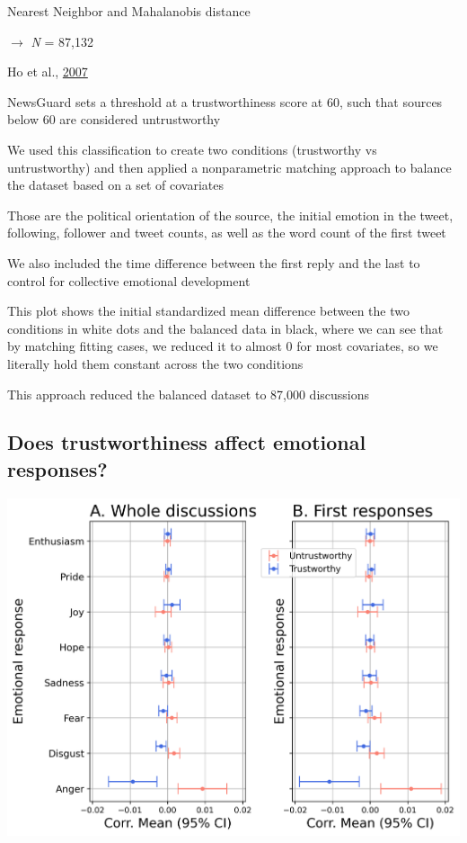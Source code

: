 \documentclass[
  letterpaper,
  DIV=11,
  numbers=noendperiod]{scrartcl}
\begin{document}
Nearest Neighbor and Mahalanobis distance

\(\rightarrow\) \emph{N} = 87,132

Ho et al.,
\href{https://www.cambridge.org/core/journals/political-analysis/article/matching-as-nonparametric-preprocessing-for-reducing-model-dependence-in-parametric-causal-inference/4D7E6D07C9727F5A604E5C9FCCA2DD21}{2007}

NewsGuard sets a threshold at a trustworthiness score at 60, such that
sources below 60 are considered untrustworthy

We used this classification to create two conditions (trustworthy vs
untrustworthy) and then applied a nonparametric matching approach to
balance the dataset based on a set of covariates

Those are the political orientation of the source, the initial emotion
in the tweet, following, follower and tweet counts, as well as the word
count of the first tweet

We also included the time difference between the first reply and the
last to control for collective emotional development

This plot shows the initial standardized mean difference between the two
conditions in white dots and the balanced data in black, where we can
see that by matching fitting cases, we reduced it to almost 0 for most
covariates, so we literally hold them constant across the two conditions

This approach reduced the balanced dataset to 87,000 discussions

\hypertarget{does-trustworthiness-affect-emotional-responses}{%
\subsection{Does trustworthiness affect emotional
responses?}\label{does-trustworthiness-affect-emotional-responses}}

\includegraphics[width=8.33333in,height=\textheight]{images/mean_emotion_matched-95.png}
\end{document}

